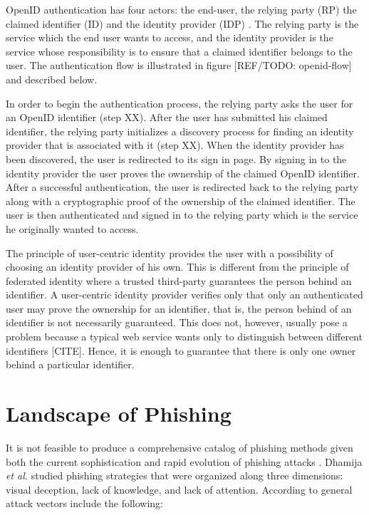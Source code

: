 \documentclass{tktltiki}
\begin{document}
    OpenID authentication has four actors: the end-user, the relying party (RP) the claimed identifier (ID) and the identity provider (IDP) \cite{openid_2.0_platform_2009}. The relying party is the service which the end user wants to access, and the identity provider is the service whose responsibility is to ensure that a claimed identifier belongs to the user. The authentication flow is illustrated in figure [REF/TODO: openid-flow] and described below.
          
     In order to begin the authentication process, the relying party asks the user for an OpenID identifier (step XX). After the user has submitted his claimed identifier, the relying party initializes a discovery process for finding an identity provider that is associated with it (step XX). When the identity provider has been discovered, the user is redirected to its sign in page. By signing in to the identity provider the user proves the ownership of the claimed OpenID identifier. After a successful authentication, the user is redirected back to the relying party along with a cryptographic proof of the ownership of the claimed identifier. The user is then authenticated and signed in to the relying party which is the service he originally wanted to access.

     The principle of user-centric identity provides the user with a possibility of choosing an identity provider of his own. This is different from the principle of federated identity where a trusted third-party guarantees the person behind an identifier. A user-centric identity provider verifies only that only an authenticated user may prove the ownership for an identifier, that is, the person behind of an identifier is not necessarily guaranteed. This does not, however, usually pose a problem because a typical web service wants only to distinguish between different identifiers [CITE]. Hence, it is enough to guarantee that there is only one owner behind a particular identifier.

        
      
\section{Landscape of Phishing}

    It is not feasible to produce a comprehensive catalog of phishing methods given both the current sophistication and rapid evolution of phishing attacks \cite{phishing_attacks_and_solutions_2007}. Dhamija 
\emph{et al.} \cite{why_phishing_works_06} studied phishing strategies that were organized along three dimensions: visual deception, lack of knowledge, and lack of attention. According to \cite{phishing_attacks_and_solutions_2007, suspectibility_to_phishing_2006} general attack vectors include the following:
\end{document}
